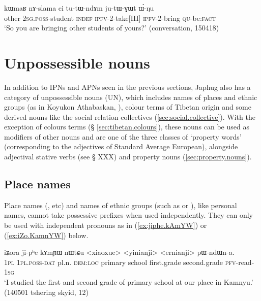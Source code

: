 \begin{exe}
\ex \label{ex:kWmaR.nAslama}
 \gll  kɯmaʁ nɤ-slama ci tu-tɯ-ndɤm ju-tɯ-ɣɯt ɯ́-ŋu \\
 other \textsc{2sg}.\textsc{poss}-student \textsc{indef} \textsc{ipfv}-2-take[III] \textsc{ipfv}-2-bring \textsc{qu}-be:\textsc{fact} \\
 \glt `So you are bringing other students of yours?' (conversation, 150418)
\end{exe}

\section{Unpossessible nouns} \label{sec:unpossessible.nouns}
In addition to IPNs and APNs seen in the previous sections, Japhug also has a category of unpossessible nouns (UN), which includes names of places and ethnic groups (as in Koyukon Athabaskan, \citealt[651]{thompson96koyukon}), colour terms of Tibetan origin and some derived nouns like the social relation collectives (\ref{sec:social.collective}). With the exception of colours terms (§ \ref{sec:tibetan.colours}), these nouns can be used as modifiers of other nouns and are one of the three classes of `property words' (corresponding to the adjectives of Standard Average European),  alongside adjectival stative verbs (see § XXX) and property nouns (\ref{sec:property.nouns}).

 

\subsection{Place names}  \label{sec:place.names}
Place names (,  etc) and names of ethnic groups (such as  or ), like personal names, cannot take possessive prefixes when used independently. They can only be used with independent pronouns as in (\ref{ex:jiphe.kAmYW}) or (\ref{ex:iZo.KamnYW}) below.

\begin{exe}
\ex \label{ex:jiphe.kAmYW}
\gll   iʑora ji-pʰe kɤmɲɯ nɯtɕu <xiaoxue> <yinianji> <ernianji> pɯ-ndɯn-a. \\
\textsc{1pl} \textsc{1pl}.\textsc{poss}-\textsc{dat} pl.n. \textsc{dem}:\textsc{loc} primary school first.grade second.grade \textsc{pfv}-read-\textsc{1sg} \\
\glt `I studied the first and second grade of primary school at our place in Kamnyu.' (140501 tshering skyid, 12)
\end{exe}

